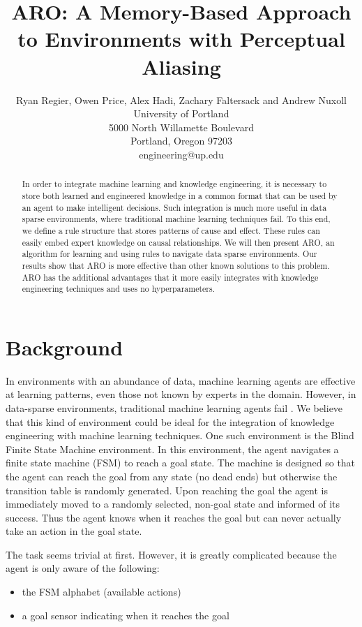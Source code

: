 \documentclass[letterpaper]{article} %
\title{ARO:  A Memory-Based Approach to Environments with Perceptual Aliasing }
\author{Ryan Regier, Owen Price, Alex Hadi, Zachary Faltersack and Andrew Nuxoll \\ 
University of Portland\\ %
5000 North Willamette Boulevard\\
Portland, Oregon 97203\\
engineering@up.edu %
}
\begin{document}
\maketitle

\begin{abstract}

In order to integrate machine learning and knowledge engineering, it
is necessary to store both learned and engineered knowledge in a
common format that can be used by an agent to make intelligent
decisions. Such integration is much more useful in data sparse
environments, where traditional machine learning techniques fail.  To
this end, we define a rule structure that stores patterns of cause and
effect. These rules can easily embed expert knowledge on causal
relationships. We will then present ARO, an algorithm for learning and
using rules to navigate data sparse environments. Our results show
that ARO is more effective than other known solutions to this
problem. ARO has the additional advantages that it more easily
integrates with knowledge engineering techniques and uses no
hyperparameters.

\end{abstract}

\noindent




\section{Background}

In environments with an abundance of data, machine learning agents are
effective at learning patterns, even those not known by experts in the
domain. However, in data-sparse environments, traditional machine
learning agents fail \cite{Chrisman92}. We believe that this kind of
environment could be ideal for the integration of knowledge
engineering with machine learning techniques. One such environment is
the Blind Finite State Machine environment.  In this environment, the
agent navigates a finite state machine (FSM) \cite{Hopcroft06} to
reach a goal state.  The machine is designed so that the agent can
reach the goal from any state (no dead ends) but otherwise the
transition table is randomly generated.  Upon reaching the goal the
agent is immediately moved to a randomly selected, non-goal state and
informed of its success.  Thus the agent knows when it reaches the
goal but can never actually take an action in the goal state.

The task seems trivial at first.  However, it is greatly complicated
because the agent is only aware of the following:
\begin{itemize}
\item the FSM alphabet (available actions)
\item a goal sensor indicating when it reaches the goal
\end{itemize}
\end{document}

